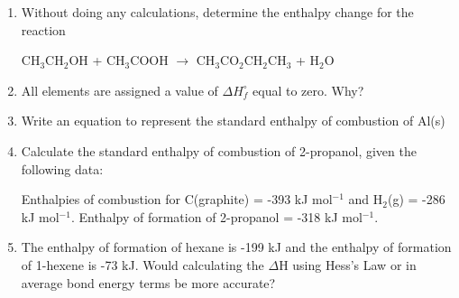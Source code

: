 \documentclass[../chem.tex]{subfiles}
\begin{document}
\begin{enumerate}
    \item Without doing any calculations, determine the enthalpy change for the reaction
    \begin{center}
        CH$_3$CH$_2$OH + CH$_3$COOH $\rightarrow$ CH$_3$CO$_2$CH$_2$CH$_3$ + H$_2$O
    \end{center}

    \item All elements are assigned a value of $\Delta H_f^{\circ}$ equal to zero. Why?
    \item Write an equation to represent the standard enthalpy of combustion of Al(s)
    \item Calculate the standard enthalpy of combustion of 2-propanol, given the following data: 
    
    Enthalpies of combustion for C(graphite) = -393 kJ mol$^{-1}$ and H$_2$(g) = -286 kJ mol$^{-1}$. Enthalpy of formation of 2-propanol = -318 kJ mol$^{-1}$.
    \item The enthalpy of formation of hexane is -199 kJ and the enthalpy of formation of 1-hexene is -73 kJ. Would calculating the $\Delta$H using Hess's Law or in average bond energy terms be more accurate?

\end{enumerate}
\end{document}
